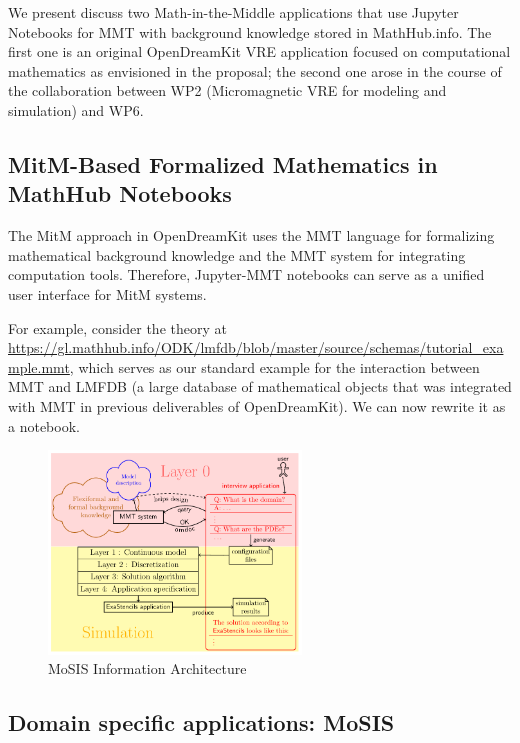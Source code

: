 We present discuss two Math-in-the-Middle applications that use Jupyter Notebooks for MMT with background knowledge stored in MathHub.info.
The first one is an original OpenDreamKit VRE application focused on computational mathematics as envisioned in the proposal;
the second one arose in the course of the collaboration between WP2 (Micromagnetic VRE for modeling and simulation) and WP6.

\subsection{MitM-Based Formalized Mathematics in MathHub Notebooks}

The MitM approach in  OpenDreamKit uses the MMT language for formalizing mathematical background knowledge and the MMT system for integrating computation tools.
Therefore, Jupyter-MMT notebooks can serve as a unified user interface for MitM systems.

For example, consider the theory at \url{https://gl.mathhub.info/ODK/lmfdb/blob/master/source/schemas/tutorial_example.mmt}, which serves as our standard example for the interaction between MMT and LMFDB (a large database of mathematical objects that was integrated with MMT in previous deliverables of OpenDreamKit).
We can now rewrite it as a notebook.

\begin{figure}[ht]\centering
  \includegraphics[width=0.6\textwidth]{proto}
  \caption{MoSIS Information Architecture}\label{fig:prototype}
\end{figure}

\subsection{Domain specific applications: MoSIS}

